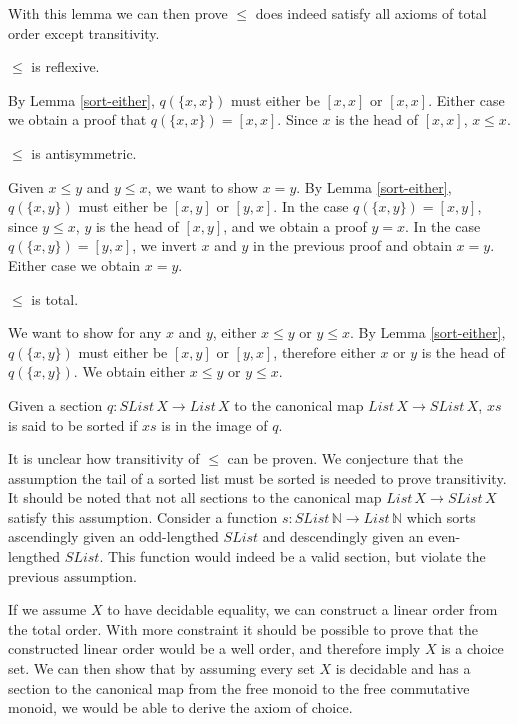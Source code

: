 \documentclass{article}
\begin{document}
With this lemma we can then prove $\leq$ does indeed satisfy all axioms of total order except transitivity.

\begin{mythm}
    $\leq$ is reflexive.
\end{mythm}
    By Lemma \ref{sort-either}, $q(\{x, x\})$ must either be $[x, x]$ or $[x ,x]$. Either case we obtain a proof that
    $q(\{x, x\}) = [x, x]$. Since $x$ is the head of $[x, x]$, $x \leq x$.

\begin{mythm}
    $\leq$ is antisymmetric.
\end{mythm}
    Given $x \leq y$ and $y \leq x$, we want to show $x = y$.
    By Lemma \ref{sort-either}, $q(\{x, y\})$ must either be $[x, y]$ or $[y, x]$. In the case $q(\{x, y\}) = [x, y]$,
    since $y \leq x$, $y$ is the head of $[x, y]$, and we obtain a proof $y = x$. In the case $q(\{x, y\}) = [y, x]$,
    we invert $x$ and $y$ in the previous proof and obtain $x = y$. Either case we obtain $x = y$.

\begin{mythm}
    $\leq$ is total.
\end{mythm}
    We want to show for any $x$ and $y$, either $x \leq y$ or $y \leq x$.
    By Lemma \ref{sort-either}, $q(\{x, y\})$ must either be $[x, y]$ or $[y, x]$, therefore either $x$ or $y$
    is the head of $q(\{x, y\})$. We obtain either $x \leq y$ or $y \leq x$.

\begin{mydef}
    Given a section $q : SList \, X \rightarrow List \, X$ to the canonical map $List \, X \rightarrow SList \, X$,
    $xs$ is said to be sorted if $xs$ is in the image of $q$.
\end{mydef}

It is unclear how transitivity of $\leq$ can be proven. We conjecture that the assumption the tail of a sorted list
must be sorted is needed to prove transitivity. It should be noted that not all sections to the canonical map $List \, X \rightarrow SList \, X$
satisfy this assumption. Consider a function $s : SList \, \mathbb{N} \rightarrow List \, \mathbb{N}$ which sorts ascendingly given an odd-lengthed
$SList$ and descendingly given an even-lengthed $SList$. This function would indeed be a valid section, but violate the previous assumption.

If we assume $X$ to have decidable equality, we can construct a linear order from the total order.
With more constraint it should be possible to prove that the constructed linear order would be a well order, and therefore imply $X$ is a choice
set. We can then show that by assuming every set $X$ is decidable and has a section to the canonical map from the free monoid to the free commutative monoid, we
would be able to derive the axiom of choice.
\end{document}
